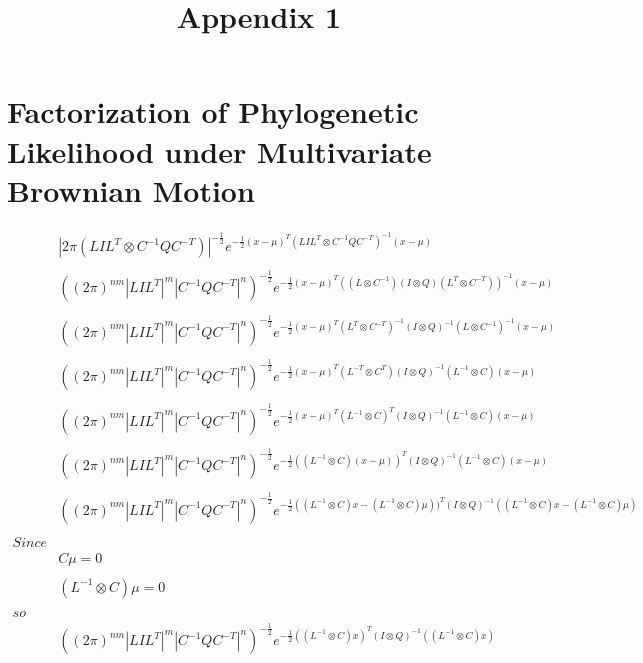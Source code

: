 \documentclass[10pt]{article}
\title{\vspace{-2.5cm}Appendix 1}
\author{}
\date{}
\begin{document}
\maketitle{}

\section*{Factorization of Phylogenetic Likelihood under Multivariate Brownian Motion}

\begin{align*}
&|2\pi(LIL^T \otimes C^{-1}QC^{-T})|^{-\frac{1}{2}}e^{-\frac{1}{2}(x-\mu)^T(LIL^T \otimes C^{-1}QC^{-T})^{-1}(x-\mu)}\\
\\
&((2\pi)^{nm}|LIL^T|^m |C^{-1}QC^{-T}|^n)^{-\frac{1}{2}}e^{-\frac{1}{2}(x-\mu)^T((L \otimes C^{-1})(I \otimes Q)(L^T \otimes C^{-T}))^{-1}(x-\mu)}\\
\\
&((2\pi)^{nm}|LIL^T|^m |C^{-1}QC^{-T}|^n)^{-\frac{1}{2}}e^{-\frac{1}{2}(x-\mu)^T(L^T \otimes C^{-T})^{-1}(I \otimes Q)^{-1}(L \otimes C^{-1})^{-1}(x-\mu)}\\
\\
&((2\pi)^{nm}|LIL^T|^m |C^{-1}QC^{-T}|^n)^{-\frac{1}{2}}e^{-\frac{1}{2}(x-\mu)^T(L^{-T} \otimes C^{T})(I \otimes Q)^{-1}(L^{-1} \otimes C)(x-\mu)}\\
\\
&((2\pi)^{nm}|LIL^T|^m |C^{-1}QC^{-T}|^n)^{-\frac{1}{2}}e^{-\frac{1}{2}(x-\mu)^T(L^{-1} \otimes C)^{T}(I \otimes Q)^{-1}(L^{-1} \otimes C)(x-\mu)}\\
\\
&((2\pi)^{nm}|LIL^T|^m |C^{-1}QC^{-T}|^n)^{-\frac{1}{2}}e^{-\frac{1}{2}((L^{-1} \otimes C)(x-\mu))^{T}(I \otimes Q)^{-1}(L^{-1} \otimes C)(x-\mu)}\\
\\
&((2\pi)^{nm}|LIL^T|^m |C^{-1}QC^{-T}|^n)^{-\frac{1}{2}}e^{-\frac{1}{2}((L^{-1} \otimes C)x-(L^{-1} \otimes C)\mu))^{T}(I \otimes Q)^{-1}((L^{-1} \otimes C)x-(L^{-1} \otimes C)\mu)}\\
\\
Since \\
&C\mu = 0\\
\\
&(L^{-1} \otimes C)\mu = 0\\
\\
so\\
&((2\pi)^{nm}|LIL^T|^m |C^{-1}QC^{-T}|^n)^{-\frac{1}{2}}e^{-\frac{1}{2}((L^{-1} \otimes C)x)^{T}(I \otimes Q)^{-1}((L^{-1} \otimes C)x)}\\
\end{align*} %
\end{document}
